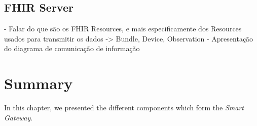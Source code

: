 \subsection{FHIR Server}

- Falar do que são os FHIR Resources, e mais especificamente dos Resources usados para transmitir os dados -> Bundle, Device, Observation
- Apresentação do diagrama de comunicação de informação

\section{Summary}

In this chapter, we presented the different components which form the \textit{Smart Gateway}.
